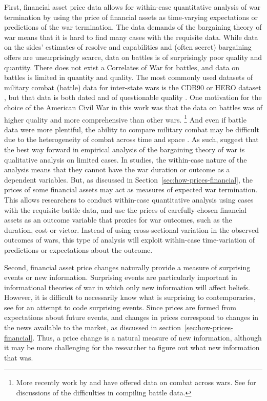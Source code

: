 First, financial asset price data allows for within-case quantitative analysis of war termination by using the price of financial assets as time-varying expectations or predictions of the war termination.
The data demands of the bargaining theory of war means that it is hard to find many cases with the requisite data.
While data on the sides' estimates of resolve and capabilities and (often secret) bargaining offers are unsurprisingly scarce, data on battles is of surprisingly poor quality and quantity.
There does not exist a Correlates of War for battles, and data on battles is limited in quantity and quality.
The most commonly used datasets of military combat (battle) data for inter-state wars is the CDB90 or HERO dataset \parencites{HistoricalResearchEtAl1984}{cdb90}, but that data is both dated and of questionable quality \parencites[32]{Reiter2003}{BiddleLong2004}.
One motivation for the choice of the American Civil War in this work was that the data on battles was of higher quality and more comprehensive than other wars.
\footnote{
More recently work by \textcite{Weisiger2015} and \textcite{CochranLong2014} have offered data on combat across wars.
See \textcites{cdb90}{Helmbold1995} for discussions of the difficulties in compiling battle data.
}
And even if battle data were more plentiful, the ability to compare military combat may be difficult due to the heterogeneity of combat across time and space \parencite{Reiter2009}.
As such, \textcites{Reiter2003}{Reiter2009} suggest that the best way forward in empirical analysis of the bargaining theory of war is qualitative analysis on limited cases.
In studies, the within-case nature of the analysis means that they cannot have the war duration or outcome as a dependent variables.
But, as discussed in Section~\ref{sec:how-prices-financial}, the prices of some financial assets may act as measures of expected war termination.
This allows researchers to conduct within-case quantitative analysis using cases with the requisite battle data, and use the prices of carefully-chosen financial assets as an outcome variable that proxies for war outcomes, such as the duration, cost or victor.
Instead of using cross-sectional variation in the observed outcomes of wars, this type of analysis will exploit within-case time-variation of predictions or expectations about the outcome.

Second, financial asset price changes naturally provide a measure of surprising events or new information.
Surprising events are particularly important in informational theories of war in which only new information will affect beliefs.
However,  it is difficult to necessarily know what is surprising to contemporaries, see \textcite{Shirkey2009a} for an attempt to code surprising events.
Since prices are formed from expectations about future events, and changes in prices correspond to changes in the news available to the market, as discussed in section~\ref{sec:how-prices-financial}.
Thus, a price change is a natural measure of new information, although it may be more challenging for the researcher to figure out what new information that was.

